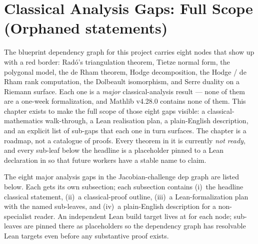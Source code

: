 \section{Classical Analysis Gaps: Full Scope (Orphaned statements)}
\label{sec:classical-analysis-gaps}

\begin{layman}
The blueprint dependency graph for this project carries eight nodes
that show up with a red border: Rad\'o's triangulation theorem, Tietze
normal form, the polygonal model, the de Rham theorem, Hodge
decomposition, the Hodge / de Rham rank computation, the Dolbeault
isomorphism, and Serre duality on a Riemann surface. Each one is a
\emph{major} classical-analysis result --- none of them are a one-week
formalization, and Mathlib v4.28.0 contains none of them. This
chapter exists to make the full scope of those eight gaps visible: a
classical-mathematics walk-through, a Lean realisation plan, a
plain-English description, and an explicit list of sub-gaps that each
one in turn surfaces. The chapter is a roadmap, not a catalogue of
proofs. Every theorem in it is currently \emph{not ready}, and every
sub-leaf below the headline is a placeholder pinned to a Lean
declaration in  so that future workers
have a stable name to claim.
\end{layman}

The eight major analysis gaps in the Jacobian-challenge dep graph are
listed below.  Each gets its own subsection; each subsection contains
(i)~the headline classical statement, (ii)~a classical-proof outline,
(iii)~a Lean-formalization plan with the named sub-leaves, and
(iv)~a plain-English description for a non-specialist reader.  An
independent Lean build target lives at
 for each node; sub-leaves
are pinned there as  placeholders
so the dependency graph has resolvable Lean targets even before any
substantive proof exists.

